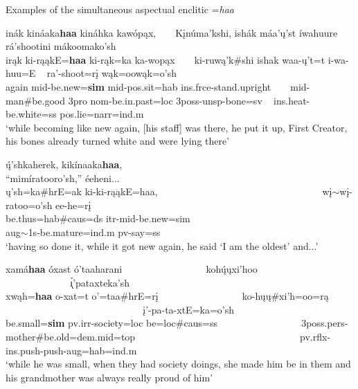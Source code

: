 \begin{exe}

\item\label{simultaneousaspectualencliticEx} Examples of the simultaneous aspectual enclitic =\textit{haa}

	\begin{xlist}
	
	\item\label{simultaneousaspectualenclitic1} 
	
	\glll inák kináaka\textbf{haa} kináhka kawópąx, ~ ~   Kįnúma'kshi, ishák máa'ų'st íwahuure ~ rá'shootini mákoomako'sh\\
	irąk ki-rąąkE=\textbf{haa} ki-rąk=ka ka-wopąx ~ ~  ki-ruwą'k\#shi ishak waa-ų't=t i-wa-huu=E ~ ra'-shoot=rį wąk=oowąk=o'sh\\
	\textnormal{again} mid-\textnormal{be.new}=\textbf{sim} mid-pos.sit=hab ins.frce-\textnormal{stand.upright} ~ ~  mid-\textnormal{man}\#\textnormal{be.good} 3pro nom-\textnormal{be.in.past}=loc 3poss-unsp-\textnormal{bone}=sv ~ ins.heat-\textnormal{be.white}=ss pos.lie=narr=ind.m\\
	\glt `while becoming like new again, [his staff] was there, he put it up, First Creator, his bones already turned white and were lying there' \citep[1]{hollow1973a}

	\item\label{simultaneousaspectualenclitic2} 

	\glll ų́'shkaherek, kikínaaka\textbf{haa}, ~ ~ ~ ~ ~ ~ ~ ~ ~ ~ ~ ~ ~ ~ ~ ~ ~ ~ ~ ~  ``mimíratooro'sh,'' éeheni...\\
	ų'sh=ka\#hrE=ak ki-ki-rąąkE=haa, ~ ~ ~ ~ ~ ~ ~ ~ ~ ~ ~ ~ ~ ~ ~ ~ ~ ~ ~ ~ wį$\sim$wį-ratoo=o'sh ee-he=rį\\
	\textnormal{be.thus}=hab\#caus=ds itr-mid-\textnormal{be.new}=sim ~ ~ ~ ~ ~ ~ ~ ~ ~ ~ ~ ~ ~ ~ ~ ~ ~ ~ ~ ~ aug$\sim$1s-\textnormal{be.mature}=ind.m pv-\textnormal{say}=ss\\
	\glt `having so done it, while it got new again, he said `I am the oldest' and...' \citep[2]{hollow1973a}
	

	\item\label{simultaneousaspectualenclitic3} 

	\glll xamá\textbf{haa} óxast ó'taaharani ~ ~ ~ ~ ~ ~ ~ ~ ~ ~  kohų́ųxi'hoo ~ ~ ~ ~ ~ ~ ~ ~ ~ ~ ~ ~ ~ ~ ~  ~ ~ ~ ~ ~  \'{ı̨}'pataxteka'sh\\
	xwąh=\textbf{haa} o-xat=t o'=taa\#hrE=rį ~ ~ ~ ~ ~ ~ ~ ~ ~ ~  ko-hųų\#xi'h=oo=rą ~ ~ ~ ~ ~ ~ ~ ~ ~ ~ ~ ~ ~ ~ ~  ~ ~ ~ ~ ~  į'-pa-ta-xtE=ka=o'sh\\
	\textnormal{be.small}=\textbf{sim} pv.irr-\textnormal{society}=loc \textnormal{be}=loc\#caus=ss ~ ~ ~ ~ ~ ~ ~ ~ ~ ~  3poss.pers-\textnormal{mother}\#\textnormal{be.old}=dem.mid=top ~ ~ ~ ~ ~ ~ ~ ~ ~ ~ ~ ~ ~ ~ ~ ~ ~ ~ ~ ~  pv.rflx-ins.push-\textnormal{push}-aug=hab=ind.m\\
	\glt `while he was small, when they had society doings, she made him be in them and his grandmother was always really proud of him' \citep[64]{hollow1973a}


\end{xlist}
\end{exe}
